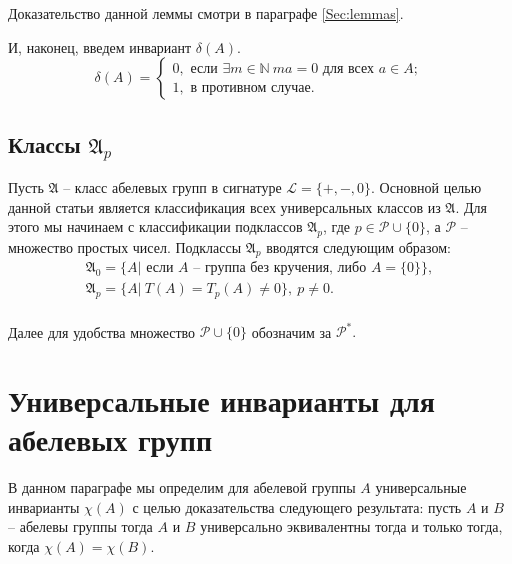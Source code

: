 \documentclass[a4paper,11pt,twoside]{article}
\newtheorem{proposition}{Предложение}[section]
\def\A{{\mathfrak{A}}}
\def\P{{\mathcal{P}}}
\def\L{{\mathcal{L}}}
\def\N{{\mathbb{N}}}
\begin{document}
Доказательство данной леммы смотри в параграфе \ref{Sec:lemmas}.

И, наконец, введем инвариант $\delta(A)$.
$$\delta(A) = \left\lbrace 
\begin{array}{l}  
0, \text{ если } \exists m \in \N \ ma = 0 \text{ для всех } a \in A; \\ 
1, \text{ в противном случае.}
\end{array} 
\right.$$



\subsection{Классы $\A_p$}

Пусть $\A$ -- класс абелевых групп в сигнатуре $\L = \{+, -, 0\}.$ Основной целью данной статьи является классификация всех универсальных классов из $\A$. Для этого мы начинаем с классификации подклассов $\A_p$, где $p \in \P \cup \{0\}$, а $\P$ -- множество простых чисел. Подклассы $\A_p$ вводятся следующим образом:
$$\begin{array}{c}

\A_0 = \{A |\text{ если } A \text{ -- группа без кручения, либо } A = \{0\} \}, \\
\A_p = \{A | \ T(A) = T_p(A) \neq 0 \}, \ p \neq 0. \\
\end{array}$$ 

Далее для удобства множество $\P \cup \{0\}$ обозначим за $\P^*.$


\section{Универсальные инварианты для абелевых групп}

В данном параграфе мы определим для абелевой группы $A$ универсальные инварианты $\chi(A)$ с целью доказательства следующего результата: пусть $A$ и $B$ -- абелевы группы тогда $A$ и $B$ универсально эквивалентны тогда и только тогда, когда $\chi(A) = \chi(B)$.
\end{document}

